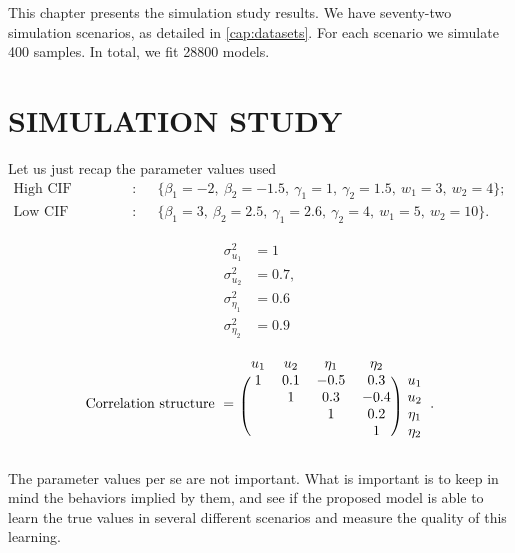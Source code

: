 This chapter presents the simulation study results. We have seventy-two
simulation scenarios, as detailed in \autoref{cap:datasets}. For each
scenario we simulate 400 samples. In total, we fit 28800 models.

\section{SIMULATION STUDY}
\label{cap:simures}

Let us just recap the parameter values used
\begin{align*}
 \text{High CIF configuration}:~&\quad
 \{\beta_{1} = -2,~\beta_{2} = -1.5,~\gamma_{1} = 1,~\gamma_{2} = 1.5,~
   w_{1} = 3,~w_{2} = 4
 \};\\
 \text{Low CIF configuration}:~&\quad
 \{\beta_{1} = 3,~\beta_{2} = 2.5,~\gamma_{1} = 2.6,~\gamma_{2} = 4,~
   w_{1} = 5,~w_{2} = 10
 \}.
\end{align*}
\begin{minipage}{0.15\textwidth}
 \begin{align*}
  \sigma_{u_{1}}^{2}   &= 1\\
  \sigma_{u_{2}}^{2}   &= 0.7,\\
  \sigma_{\eta_{1}}^{2} &= 0.6\\
  \sigma_{\eta_{2}}^{2} &= 0.9
 \end{align*}
\end{minipage}%
\begin{minipage}{0.85\textwidth}
 \[
  \text{Correlation structure}~=~\begin{blockarray}{ccccc}
                                  u_{1} & u_{2} & \eta_{1} & \eta_{2}\\
                                  \begin{block}{(cccc)c}
                                   1 & 0.1 & -0.5 &  0.3 & u_{1}\\
                                     &   1 &  0.3 & -0.4 & u_{2}\\
                                     &     &    1 &  0.2 & \eta_{1}\\
                                     &     &      &    1 & \eta_{2}\\
                                  \end{block}
                                 \end{blockarray}.
 \]
\end{minipage}

\vspace{0.3cm}
\noindent
The parameter values per se are not important. What is important is to
keep in mind the behaviors implied by them, and see if the proposed
model is able to learn the true values in several different scenarios
and measure the quality of this learning.

